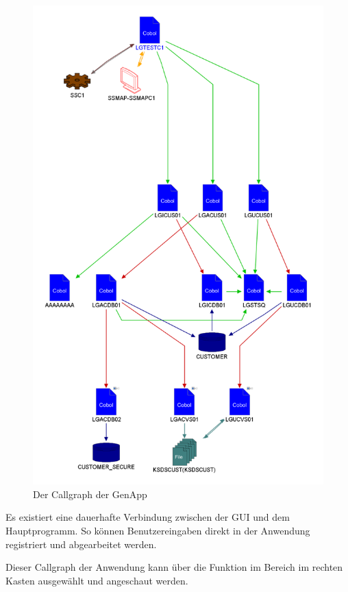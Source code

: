 \begin{figure}[h]
  \centering
    \includegraphics[scale=0.25]{images/kapitel_4/ibmad_callgraph.pdf}
  \caption{Der Callgraph der GenApp}
  \label{fig:ibmad_callgraph}
\end{figure}

Es existiert eine dauerhafte Verbindung zwischen der GUI und dem Hauptprogramm. So können Benutzereingaben direkt in der
Anwendung registriert und abgearbeitet werden.

Dieser Callgraph der Anwendung kann über die Funktion  im Bereich  im
rechten Kasten ausgewählt und angeschaut werden.

